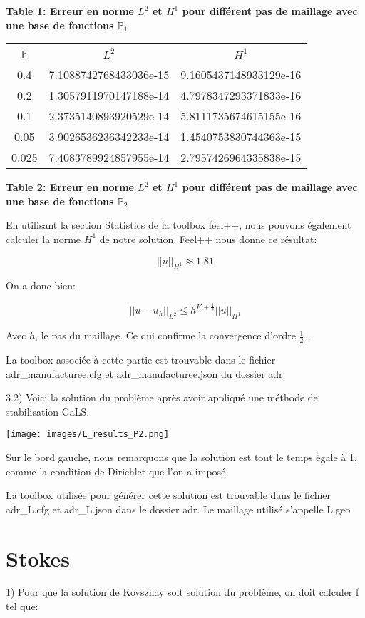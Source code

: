 \documentclass{article}
\begin{document}
\textbf{Table 1: Erreur en norme $L^2$ et $H^1$ pour différent pas de maillage avec une base de fonctions $\mathbb{P}_1$}

\begin{tabular}{c|c|c}
    h & $L^2$ & $H^1$ \\
    0.4   &  7.1088742768433036e-15 &  9.1605437148933129e-16 \\
    0.2   &  1.3057911970147188e-14 &  4.7978347293371833e-16 \\
    0.1   &  2.3735140893920529e-14 &  5.8111735674615155e-16 \\
    0.05  &  3.9026536236342233e-14 &  1.4540753830744363e-15 \\
    0.025 &  7.4083789924857955e-14 &  2.7957426964335838e-15
\end{tabular}

\textbf{Table 2: Erreur en norme $L^2$ et $H^1$ pour différent pas de maillage avec une base de fonctions $\mathbb{P}_2$}

En utilisant la section Statistics de la toolbox feel++, nous pouvons également calculer la norme $H^1$ de notre solution. Feel++ nous donne ce résultat:

$$||u||_{H^1} \approx 1.81$$

On a donc bien:

$$||u-u_h||_{L^2} \leq h^{K+\frac{1}{2}}||u||_{H^1}$$

Avec $h$, le pas du maillage. Ce qui confirme la convergence d'ordre $\frac{1}{2}$ .

La toolbox associée à cette partie est trouvable dans le fichier adr\_manufacturee.cfg et adr\_manufacturee.json du dossier adr.

3.2) Voici la solution du problème après avoir appliqué une méthode de stabilisation GaLS.

\texttt{[image: images/L\_results\_P2.png]}

Sur le bord gauche, nous remarquons que la solution est tout le temps égale à 1, comme la condition de Dirichlet que l'on a imposé.

La toolbox utilisée pour générer cette solution est trouvable dans le fichier adr\_L.cfg et adr\_L.json dans le dossier adr. Le maillage utilisé s'appelle L.geo

\section{Stokes}

1) Pour que la solution de Kovsznay soit solution du problème, on doit calculer f tel que:
\end{document}
